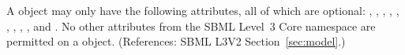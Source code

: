A \Model object may only have the following attributes, all of which are
optional: , , , ,
, , ,
, ,  and
.  No other attributes from the SBML Level~3 Core
namespace are permitted on a \Model object.  (References: SBML L3V2
Section~\ref{sec:model}.)
